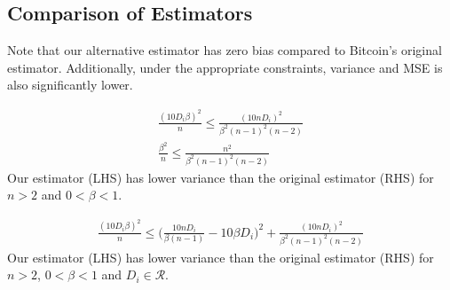 \subsection{Comparison of Estimators}
Note that our alternative estimator has zero bias compared to Bitcoin's original estimator. Additionally, under the appropriate constraints, variance and MSE is also significantly lower.
\par \noindent {}
\begin{align}
\frac{(10 D_i\beta)^2}{n} \leq \frac{(10n D_i)^2}{\beta^2(n-1)^2(n-2)} \\
\frac{\beta^2}{n} \leq \frac{n^2}{\beta^2(n-1)^2(n-2)} 
\end{align}
Our estimator (LHS) has lower variance than the original estimator (RHS) for $n>2$ and $0<\beta<1$.

\begin{align}
\frac{(10 D_i\beta)^2}{n} \leq \Bigg(\frac{10n D_i}{\beta(n-1)} - 10\beta D_i\Bigg)^2 + \frac{(10n D_i)^2}{\beta^2(n-1)^2(n-2)}
\end{align}
Our estimator (LHS) has lower variance than the original estimator (RHS) for $n>2$, $0<\beta<1$ and $D_i \in \mathcal{R}$. 

